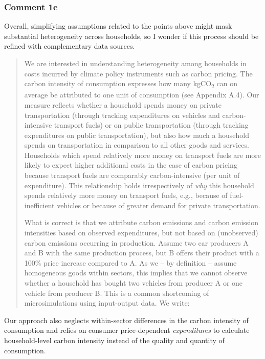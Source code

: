 \documentclass[11pt]{article}
\newenvironment{response}
{\begin{quote}\color{black}}
{\end{quote}}
\begin{document}
\subsubsection*{Comment 1e}\label{comment_R2_1e}

\begin{commentbox}
    Overall, simplifying assumptions related to the points above might mask substantial heterogeneity across households, so I wonder if this process should be refined with complementary data sources.
\end{commentbox}

\begin{response}
    We are interested in understanding heterogeneity among households in costs incurred by climate policy instruments such as carbon pricing. The carbon intensity of consumption expresses how many kgCO\textsubscript{2} can on average be attributed to one unit of consumption (see Appendix A.4). Our measure reflects whether a household spends money on private transportation (through tracking expenditures on vehicles and carbon-intensive transport fuels) or on public transportation (through tracking expenditures on public transportation), but also how much a household spends on transportation in comparison to all other goods and services. Households which spend relatively more money on transport fuels are more likely to expect higher additional costs in the case of carbon pricing because transport fuels are comparably carbon-intensive (per unit of expenditure). This relationship holds irrespectively of \textit{why} this household spends relatively more money on transport fuels, e.g., because of fuel-inefficient vehicles or because of greater demand for private transportation.

    What is correct is that we attribute carbon emissions and carbon emission intensities based on observed expenditures, but not based on (unobserved) carbon emissions occurring in production. Assume two car producers A and B with the same production process, but B offers their product with a 100\% price increase compared to A. As we -- by definition -- assume homogeneous goods within sectors, this implies that we cannot observe whether a household has bought two vehicles from producer A or one vehicle from producer B. This is a common shortcoming of microsimulations using input-output data. We write:
\end{response}    

\begin{revisionbox}
    Our approach also neglects within-sector differences in the carbon intensity of consumption and relies on consumer price-dependent \textit{expenditures} to calculate household-level carbon intensity instead of the quality and quantity of consumption.
\end{revisionbox}    
\end{document}
